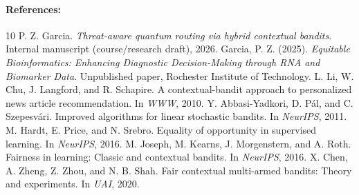 \documentclass[12pt]{article}
\begin{document}
\paragraph{References:} \hspace{-5mm}
\begin{thebibliography}{10}
P. Z. Garcia. {\it Threat-aware quantum routing via hybrid contextual bandits}. Internal manuscript (course/research draft), 2026.
Garcia, P. Z. (2025). {\it Equitable Bioinformatics: Enhancing Diagnostic Decision-Making through RNA and Biomarker Data}. Unpublished paper, Rochester Institute of Technology.
L. Li, W. Chu, J. Langford, and R. Schapire. A contextual-bandit approach to personalized news article recommendation. In {\it WWW}, 2010.
Y. Abbasi-Yadkori, D. P{\'a}l, and C. Szepesv{\'a}ri. Improved algorithms for linear stochastic bandits. In {\it NeurIPS}, 2011.
M. Hardt, E. Price, and N. Srebro. Equality of opportunity in supervised learning. In {\it NeurIPS}, 2016.
M. Joseph, M. Kearns, J. Morgenstern, and A. Roth. Fairness in learning: Classic and contextual bandits. In {\it NeurIPS}, 2016.
X. Chen, A. Zheng, Z. Zhou, and N. B. Shah. Fair contextual multi-armed bandits: Theory and experiments. In {\it UAI}, 2020.
\end{thebibliography}
\end{document}
